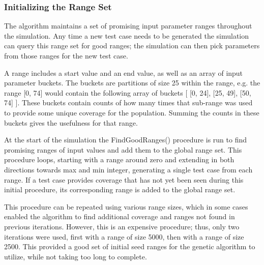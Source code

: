 \documentclass[runningheads]{llncs}
\begin{document}
\subsubsection{Initializing the Range Set}

The algorithm maintains a set of promising input parameter ranges throughout the simulation. Any time a new test case needs to be generated the simulation can query this range set for good ranges; the simulation can then pick parameters from those ranges for the new test case. 

A range includes a start value and an end value, as well as an array of input parameter buckets. The buckets are partitions of size 25 within the range, e.g. the range [0, 74] would contain the following array of buckets [ [0, 24], [25, 49], [50, 74] ]. These buckets contain counts of how many times that sub-range was used to provide some unique coverage for the population. Summing the counts in these buckets gives the usefulness for that range.

At the start of the simulation the FindGoodRanges() procedure is run to find promising ranges of input values and add them to the global range set. This procedure loops, starting with a range around zero and extending in both directions towards max and min integer, generating a single test case from each range. If a test case provides coverage that has not yet been seen during this initial procedure, its corresponding range is added to the global range set. 

This procedure can be repeated using various range sizes, which in some cases enabled the algorithm to find additional coverage and ranges not found in previous iterations. However, this is an expensive procedure; thus, only two iterations were used, first with a range of size 5000, then with a range of size 2500. This provided a good set of initial seed ranges for the genetic algorithm to utilize, while not taking too long to complete.
\end{document}
